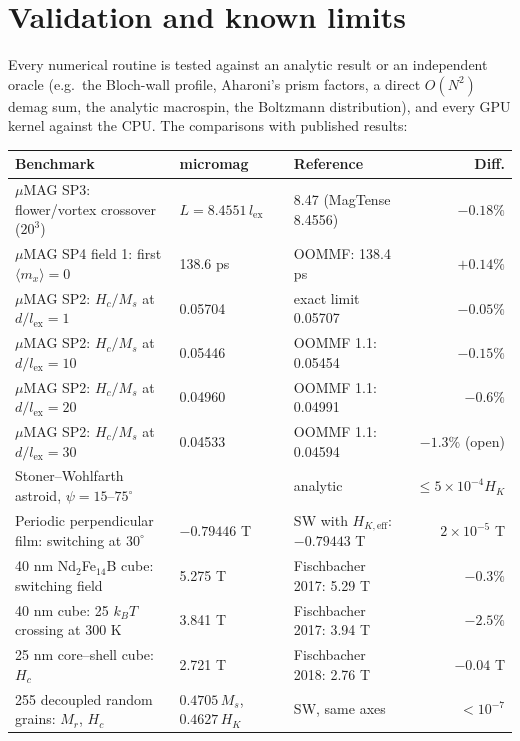 \documentclass[10pt,a4paper]{article}
\begin{document}
\section{Validation and known limits}
\label{sec:validation}

Every numerical routine is tested against an analytic result or an independent oracle (e.g.\ the Bloch-wall profile,
Aharoni's prism factors, a direct $O(N^2)$ demag sum, the analytic macrospin, the Boltzmann distribution), and every GPU
kernel against the CPU. The comparisons with published results:

\begin{center}\small
\begin{tabularx}{\textwidth}{@{}Y l l r@{}}
\toprule
Benchmark & micromag & Reference & Diff. \\
\midrule
$\mu$MAG SP3: flower/vortex crossover ($20^3$) & $L = 8.4551\,l_\mathrm{ex}$ & 8.47 (MagTense 8.4556) & $-0.18\%$ \\
$\mu$MAG SP4 field 1: first $\langle m_x\rangle = 0$ & 138.6 ps & OOMMF: 138.4 ps & $+0.14\%$ \\
$\mu$MAG SP2: $H_c/M_s$ at $d/l_\mathrm{ex}=1$ & 0.05704 & exact limit 0.05707 & $-0.05\%$ \\
$\mu$MAG SP2: $H_c/M_s$ at $d/l_\mathrm{ex}=10$ & 0.05446 & OOMMF 1.1: 0.05454 & $-0.15\%$ \\
$\mu$MAG SP2: $H_c/M_s$ at $d/l_\mathrm{ex}=20$ & 0.04960 & OOMMF 1.1: 0.04991 & $-0.6\%$ \\
$\mu$MAG SP2: $H_c/M_s$ at $d/l_\mathrm{ex}=30$ & 0.04533 & OOMMF 1.1: 0.04594 & $-1.3\%$ (open) \\
Stoner--Wohlfarth astroid, $\psi = 15$--$75^\circ$ & & analytic & $\leq 5\times10^{-4}H_K$ \\
Periodic perpendicular film: switching at $30^\circ$ & $-0.79446$ T & SW with $H_{K,\mathrm{eff}}$: $-0.79443$ T & $2\times10^{-5}$ T \\
40 nm Nd$_2$Fe$_{14}$B cube: switching field & 5.275 T & Fischbacher 2017: 5.29 T & $-0.3\%$ \\
40 nm cube: 25 $k_BT$ crossing at 300 K & 3.841 T & Fischbacher 2017: 3.94 T & $-2.5\%$ \\
25 nm core--shell cube: $H_c$ & 2.721 T & Fischbacher 2018: 2.76 T & $-0.04$ T \\
255 decoupled random grains: $M_r$, $H_c$ & $0.4705\,M_s$, $0.4627\,H_K$ & SW, same axes & $<10^{-7}$ \\
\bottomrule
\end{tabularx}
\end{center}
\end{document}
